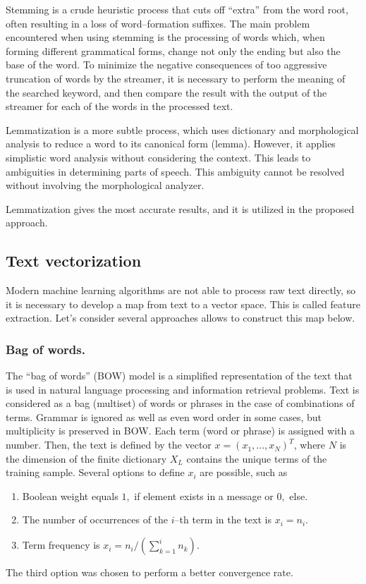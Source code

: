 \documentclass[a4paper]{jpconf}
\begin{document}
Stemming is a crude heuristic process that cuts off ``extra'' from the word root, often resulting in a loss of word--formation suffixes. The main problem encountered when using stemming is the processing of words which, when forming different grammatical forms, change not only the ending but also the base of the word. To minimize the negative consequences of too aggressive truncation of words by the streamer, it is necessary to perform the meaning of the searched keyword, and then compare the result with the output of the streamer for each of the words in the processed text. 

Lemmatization is a more subtle process, which uses dictionary and morphological analysis to reduce a word to its canonical form (lemma). However, it applies simplistic word analysis without considering the context. This leads to ambiguities in determining parts of speech. This ambiguity cannot be resolved without involving the morphological analyzer.

Lemmatization gives the most accurate results, and it is utilized in the proposed approach.

\subsection{Text vectorization}
Modern machine learning algorithms are not able to process raw text directly, so it is necessary to develop a map from text to a vector space. This is called feature extraction. 
Let's consider several approaches allows to construct this map below.

\subsubsection*{Bag of words.}
The ``bag of words'' (BOW) model is a simplified representation of the text that is used in natural language processing and information retrieval problems. Text is considered as a bag (multiset) of words or phrases in the case of combinations of terms. Grammar is ignored as well as even word order in some cases, but multiplicity is preserved in BOW. Each term (word or phrase) is assigned with a number. Then, the text is defined by the vector $x=(x_1,..., x_N)^T$, where $N$ is the dimension of the finite dictionary $X_L$ contains the unique terms of the training sample. Several options to define $x_i$ are possible, such as
\begin{enumerate}
\item Boolean weight equals $1,$ if element exists in a message or 
$0,$ else.
\item The number of occurrences of the $i$--th term in the text is 
$x_i = n_i.$
\item Term frequency is $x_i = n_i\slash\left(\sum\limits_{k=1}^i n_k\right).$
\end{enumerate}
The third option was chosen to perform a better convergence rate.
\end{document}
